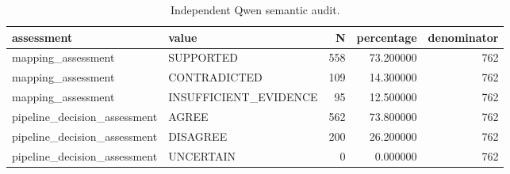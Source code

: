 \begin{table}
\caption{Independent Qwen semantic audit.}
\begin{tabular}{llrrr}
\toprule
assessment & value & N & percentage & denominator \\
\midrule
mapping\_assessment & SUPPORTED & 558 & 73.200000 & 762 \\
mapping\_assessment & CONTRADICTED & 109 & 14.300000 & 762 \\
mapping\_assessment & INSUFFICIENT\_EVIDENCE & 95 & 12.500000 & 762 \\
pipeline\_decision\_assessment & AGREE & 562 & 73.800000 & 762 \\
pipeline\_decision\_assessment & DISAGREE & 200 & 26.200000 & 762 \\
pipeline\_decision\_assessment & UNCERTAIN & 0 & 0.000000 & 762 \\
\bottomrule
\end{tabular}
\end{table}
